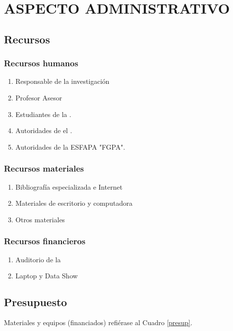 \documentclass[12pt,a4paper]{article}
\begin{document}
\section{ASPECTO  ADMINISTRATIVO}
\subsection{Recursos}

\subsubsection{Recursos humanos}
\begin{enumerate}
	\item Responsable de la investigación
	\item Profesor Asesor
	\item Estudiantes de la \lugar.
	\item Autoridades de el \lugar.
	\item Autoridades de la ESFAPA "FGPA".
\end{enumerate}

\subsubsection{Recursos materiales}
\begin{enumerate}
	\item Bibliografía especializada e Internet %
	\item Materiales de escritorio y computadora %
	\item Otros materiales %
\end{enumerate}

\subsubsection{Recursos financieros}
\begin{enumerate}
	\item Auditorio de la \lugar
	\item Laptop y Data Show
\end{enumerate}

\subsection{Presupuesto}
Materiales y equipos (financiados) refiérase al Cuadro \ref{presup}.
\end{document}
